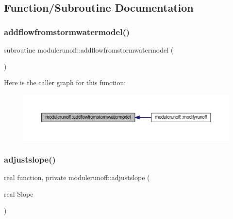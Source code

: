 \subsection{Function/\+Subroutine Documentation}
\mbox{\label{namespacemodulerunoff_abba7c93964c033b2908d8af2d841a8db}} 
\subsubsection{\texorpdfstring{addflowfromstormwatermodel()}{addflowfromstormwatermodel()}}
{\footnotesize\ttfamily subroutine modulerunoff\+::addflowfromstormwatermodel (\begin{DoxyParamCaption}{ }\end{DoxyParamCaption})\hspace{0.3cm}{\ttfamily [private]}}

Here is the caller graph for this function\+:\nopagebreak
\begin{figure}[H]
\begin{center}
\leavevmode
\includegraphics[width=350pt]{namespacemodulerunoff_abba7c93964c033b2908d8af2d841a8db_icgraph}
\end{center}
\end{figure}
\mbox{\label{namespacemodulerunoff_a5ac5c14875a2f0f2791e37f40b4321ea}} 
\subsubsection{\texorpdfstring{adjustslope()}{adjustslope()}}
{\footnotesize\ttfamily real function, private modulerunoff\+::adjustslope (\begin{DoxyParamCaption}\item[{real}]{Slope }\end{DoxyParamCaption})\hspace{0.3cm}{\ttfamily [private]}}

